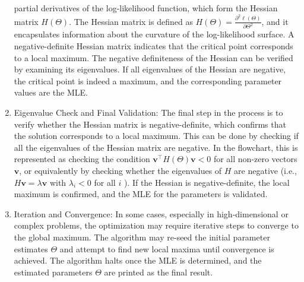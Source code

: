 \documentclass[
  12 pt,
  a4paper,
]{book}
\numberwithin{equation}{section}
\theoremstyle{plain}      %
\theoremstyle{definition} %
\theoremstyle{remark}     %
\theoremstyle{note}         %
\begin{document}
\begin{enumerate}
  partial derivatives of the log-likelihood function, which form the
  Hessian matrix \(H(\Theta)\). The Hessian matrix is defined as
  \(H(\Theta)=\frac{\partial^2 \ell(\Theta)}{\partial \Theta^2}\), and
  it encapsulates information about the curvature of the log-likelihood
  surface. A negative-definite Hessian matrix indicates that the
  critical point corresponds to a local maximum. The negative
  definiteness of the Hessian can be verified by examining its
  eigenvalues. If all eigenvalues of the Hessian are negative, the
  critical point is indeed a maximum, and the corresponding parameter
  values are the MLE.
\item
  Eigenvalue Check and Final Validation: The final step in the process
  is to verify whether the Hessian matrix is negative-definite, which
  confirms that the solution corresponds to a local maximum. This can be
  done by checking if all the eigenvalues of the Hessian matrix are
  negative. In the flowchart, this is represented as checking the
  condition \(\mathbf{v}^{\top} H(\Theta) \mathbf{v}<0\) for all
  non-zero vectors \(\mathbf{v}\), or equivalently by checking whether
  the eigenvalues of \(H\) are negative (i.e.,
  \(H \mathbf{v}=\lambda \mathbf{v}\) with \(\lambda_i<0\) for all \(i\)
  ). If the Hessian is negative-definite, the local maximum is
  confirmed, and the MLE for the parameters is validated.
\item
  Iteration and Convergence: In some cases, especially in
  high-dimensional or complex problems, the optimization may require
  iterative steps to converge to the global maximum. The algorithm may
  re-seed the initial parameter estimates \(\Theta\) and attempt to find
  new local maxima until convergence is achieved. The algorithm halts
  once the MLE is determined, and the estimated parameters \(\Theta\)
  are printed as the final result.
\end{enumerate}
\end{document}
